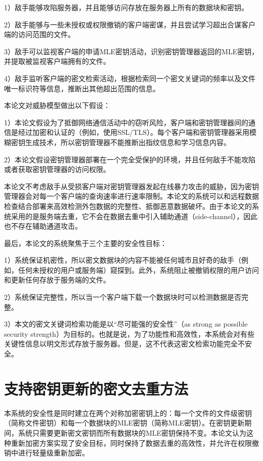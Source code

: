 \documentclass[promaster]{thesis-uestc}
\begin{document}
1）敌手能够攻陷服务器，并且能够访问存放在服务器上所有的数据块和密钥。

2）敌手能够与一些未授权或权限撤销的客户端密谋，并且尝试学习超出合谋客户端的访问范围的文件。

3）敌手可以监视客户端的申请MLE密钥活动，识别密钥管理器返回的MLE密钥，并提取被监视客户端拥有的文件。

4）敌手监听客户端的密文检索活动，根据检索同一个密文关键词的频率以及文件唯一标识符等信息，推断出其他超出范围的信息。

本论文对威胁模型做出以下假设：

1）本论文假设为了抵御网络通信活动中的窃听风险，客户端和密钥管理器间的通信是经过加密和认证的（例如，使用SSL/TLS）。每个客户端和密钥管理器采用模糊密钥生成技术，所以密钥管理器不能推断出指纹信息和学习信息内容。

2）本论文假设密钥管理器部署在一个完全受保护的环境，并且任何敌手不能攻陷或者获取密钥管理器的访问权限。

本论文不考虑敌手从受损客户端对密钥管理器发起在线暴力攻击的威胁，因为密钥管理器会对每一个客户端的查询速率进行速率限制。本论文的系统可以和远程数据检查结合部署来高效检测外包数据的完整性、抵御恶意数据破坏。由于本论文的系统采用的是服务端去重，它不会在数据去重中引入辅助通道（side-channel），因此也不存在辅助通道攻击。

最后，本论文的系统聚焦于三个主要的安全性目标：

1）系统保证机密性，所以密文数据块的内容不能被任何城市且好奇的敌手（例如，任何未授权的用户或服务端）窥探到。此外，系统阻止被撤销权限的用户访问和更新任何存放于服务端的文件。

2）系统保证完整性，所以当一个客户端下载一个数据块时可以检测数据是否完整。

3）本文的密文关键词检索功能是以“尽可能强的安全性”（as strong as possible  security strength）为目标的。也就是说，为了功能性和高效性，本系统会对有些关键性信息以明文形式存放于服务器。但是，这不代表这密文检索功能完全不安全。


\section{支持密钥更新的密文去重方法}\label{CAONT}
本系统的安全性是同时建立在两个对称加密密钥上的：每一个文件的文件级密钥（简称文件密钥）和每一个数据块的MLE密钥（简称MLE密钥）。在密钥更新期间，系统只需要更新密文密钥而所有数据块的MLE密钥保持不变。本论文认为这种重新加密方案实现了安全目标，同时保持了数据去重的高效性，并允许在权限撤销中进行轻量级重新加密。
\end{document}

